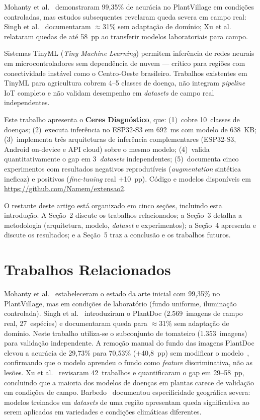 \documentclass[12pt]{article}
\begin{document}
Mohanty et al.~\cite{mohanty2016} demonstraram 99,35\% de acurácia no PlantVillage
em condições controladas, mas estudos subsequentes revelaram queda severa em campo
real: Singh et al.~\cite{singh2020} documentaram $\approx$31\% sem adaptação de
domínio; Xu et al.~\cite{xu2024} relataram quedas de até 58~pp ao transferir modelos
laboratoriais para campo.

Sistemas TinyML (\textit{Tiny Machine Learning}) permitem inferência de redes
neurais em microcontroladores sem dependência de nuvem \cite{warden2019} --- crítico
para regiões com conectividade instável como o Centro-Oeste brasileiro. Trabalhos
existentes em TinyML para
agricultura cobrem 4--5 classes de doença, não integram \textit{pipeline} IoT
completo e não validam desempenho em \textit{datasets} de campo real independentes.

Este trabalho apresenta o \textbf{Ceres Diagnóstico}, que: (1)~cobre 10~classes de
doenças; (2)~executa inferência no ESP32-S3 em 692~ms com modelo de 638~KB;
(3)~implementa três arquiteturas de inferência complementares (ESP32-S3, Android
on-device e API cloud) sobre o mesmo modelo; (4)~valida quantitativamente o gap em
3~\textit{datasets} independentes; (5)~documenta cinco experimentos com resultados
negativos reprodutíveis (\textit{augmentation} sintética ineficaz) e positivos
(\textit{fine-tuning} real $+$10~pp). Código e modelos disponíveis em
\url{https://github.com/Namem/extensao2}.

O restante deste artigo está organizado em cinco seções, incluindo esta introdução.
A Seção~2 discute os trabalhos relacionados; a Seção~3 detalha a metodologia
(arquitetura, modelo, \textit{dataset} e experimentos); a Seção~4 apresenta e discute os
resultados; e a Seção~5 traz a conclusão e os trabalhos futuros.


\section{Trabalhos Relacionados}

Mohanty et al.~\cite{mohanty2016} estabeleceram o estado da arte inicial com 99,35\%
no PlantVillage, mas em condições de laboratório (fundo uniforme, iluminação
controlada). Singh et al.~\cite{singh2020} introduziram o PlantDoc
(2.569~imagens de campo real, 27~espécies) e documentaram queda para $\approx$31\%
sem adaptação de domínio. Neste trabalho utiliza-se o subconjunto de tomateiro
(1.353~imagens) para validação independente. A remoção manual do fundo das imagens PlantDoc elevou a acurácia de
29,73\% para 70,53\% ($+$40,8~pp) sem modificar o modelo~\cite{singh2020},
confirmando que o modelo aprendeu o fundo como \textit{feature} discriminativa, não as lesões.
Xu et al.~\cite{xu2024} revisaram 42~trabalhos e quantificaram o gap em 29--58~pp,
concluindo que a maioria dos modelos de doenças em plantas carece de validação
em condições de campo. Barbedo~\cite{barbedo2019} documentou especificidade
geográfica severa: modelos treinados em \textit{datasets} de uma região apresentam queda
significativa ao serem aplicados em variedades e condições climáticas diferentes.
\end{document}
